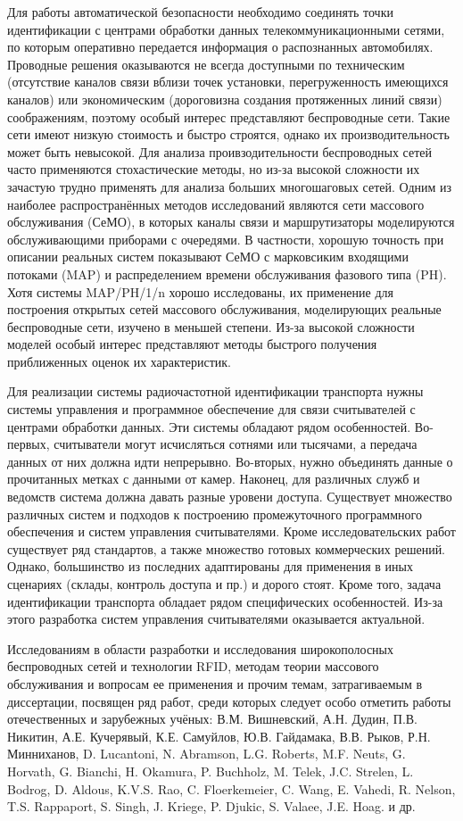 Для работы автоматической безопасности необходимо соединять точки идентификации с центрами обработки данных телекоммуникационными сетями, по которым оперативно передается информация о распознанных автомобилях. Проводные решения оказываются не всегда доступными по техническим (отсутствие каналов связи вблизи точек установки, перегруженность имеющихся каналов) или экономическим (дороговизна создания протяженных линий связи) соображениям, поэтому особый интерес представляют беспроводные сети. Такие сети имеют низкую стоимость и быстро строятся, однако их производительность может быть невысокой. Для анализа проивзодительности беспроводных сетей часто применяются стохастические методы, но из-за высокой сложности их зачастую трудно применять для анализа больших многошаговых сетей. Одним из наиболее распространённых методов исследований являются сети массового обслуживания (СеМО), в которых каналы связи и маршрутизаторы моделируются обслуживающими приборами с очередями. В частности, хорошую точность при описании реальных систем показывают СеМО с марковсиким входящими потоками (MAP) и распределением времени обслуживания фазового типа (PH). Хотя системы MAP/PH/1/n хорошо исследованы, их применение для построения открытых сетей массового обслуживания, моделирующих реальные беспроводные сети, изучено в меньшей степени. Из-за высокой сложности моделей особый интерес представляют методы быстрого получения приближенных оценок их характеристик.

Для реализации системы радиочастотной идентификации транспорта нужны системы управления и программное обеспечение для связи считывателей с центрами обработки данных. Эти системы обладают рядом особенностей. Во-первых, считыватели могут исчисляться сотнями или тысячами, а передача данных от них должна идти непрерывно. Во-вторых, нужно объединять данные о прочитанных метках с данными от камер. Наконец, для различных служб и ведомств система должна давать разные уровени доступа. Существует множество различных систем и подходов к построению промежуточного программного обеспечения и систем управления считывателями. Кроме исследовательских работ существует ряд стандартов, а также множество готовых коммерческих решений. Однако, большинство из последних адаптированы для применения в иных сценариях (склады, контроль доступа и пр.) и дорого стоят. Кроме того, задача идентификации транспорта обладает рядом специфических особенностей. Из-за этого разработка систем управления считывателями оказывается актуальной.

Исследованиям в области разработки и исследования широкополосных беспроводных сетей и технологии RFID, методам теории массового обслуживания и вопросам ее применения и прочим темам, затрагиваемым в диссертации, посвящен ряд работ, среди которых следует особо отметить работы отечественных и зарубежных учёных: В.М. Вишневский, А.Н. Дудин, П.В. Никитин, А.Е. Кучерявый, К.Е. Самуйлов, Ю.В. Гайдамака, В.В. Рыков, Р.Н. Минниханов, D. Lucantoni, N. Abramson, L.G. Roberts, M.F. Neuts, G. Horvath, G. Bianchi,  H. Okamura, P. Buchholz, M. Telek, J.C. Strelen, L. Bodrog, D. Aldous, K.V.S. Rao, C. Floerkemeier, C. Wang, E. Vahedi, R. Nelson, T.S. Rappaport, S. Singh, J. Kriege, P. Djukic, S. Valaee, J.E. Hoag. и др.


